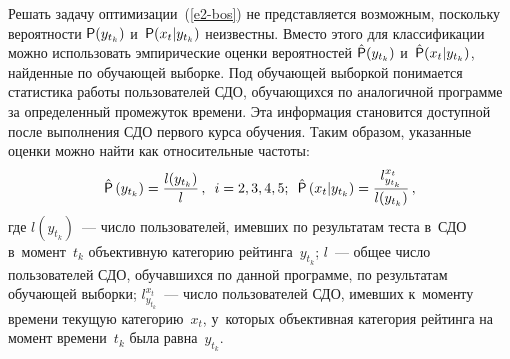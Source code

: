 \begin{multicols}{2}
      Решать задачу оптимизации~(\ref{e2-bos}) не представляется возможным, 
поскольку вероятности ${\sf P}(y_{t_k})$ и~${\sf P}(x_t\vert y_{t_k})$ неизвестны. Вместо этого для 
классификации можно использовать эмпирические оценки вероятностей 
$\hat{{\sf P}}(y_{t_k})$ и~$\hat{{\sf P}}(x_t\vert y_{t_k})$, найденные по обуча\-ющей выборке. Под 
обучающей выборкой понимается статистика работы пользователей СДО, обучающихся 
по аналогичной программе за определенный промежуток времени. Эта информация 
становится доступной после выполнения СДО первого курса обучения. Таким образом, 
указанные оценки можно найти как относительные частоты:
      $$
      \hat{{\sf P}}\left(y_{t_k}\right) = 
      \displaystyle\frac{\displaystyle l(y_{t_k})\mathstrut}{\displaystyle l\mathstrut}\,,\enskip i=2,3,4,5;\enskip
      \hat{{\sf P}}\left( x_t\vert y_{t_k}\right) =\displaystyle\frac{\displaystyle l^{x_t}_{y_{t_k}}\mathstrut}{\displaystyle l(y_{t_k})\mathstrut}\,,
      $$ 
где $ l(y_{t_k})$~--- число пользователей, имевших по результатам теста в~СДО 
в~момент~$t_k$ объективную категорию рейтинга~$y_{t_k}$; $l$~--- общее число 
пользователей СДО, обучавшихся по данной программе, по результатам обучающей 
выборки; $ l^{x_t}_{y_{t_k}}$~--- число пользователей СДО, имевших к~моменту 
времени текущую категорию~$x_t$, у~которых объективная категория рейтинга на 
момент времени~$t_k$ была равна~$y_{t_k}$.

\setcounter{table}{2}
\begin{table*}[b]\small %
\vspace*{-6pt}
\hspace*{7mm}\begin{minipage}[t]{70mm}
\begin{center}
\vspace*{2ex}


\end{center}
\end{minipage}
\end{table*}
\end{multicols}
